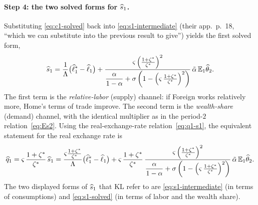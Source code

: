 \paragraph{Step 4: the two solved forms for $\widehat{s}_1$.} Substituting
\eqref{eq:c1-solved} back into \eqref{eq:s1-intermediate} (their app.~p.~18,
``which we can substitute into the previous result to give'') yields the first
solved form,
\begin{equation}
\widehat{s}_1 = \frac{1}{\Lambda}\bigl(\widehat{\ell}^{*}_1-\widehat{\ell}_1\bigr)
+\frac{\varsigma\left(\frac{1+\zeta^{*}}{\zeta^{*}}\right)^2}
{\dfrac{\alpha}{1-\alpha}+\sigma\left(1-\left(\varsigma\,\frac{1+\zeta^{*}}{\zeta^{*}}\right)^2\right)}\,\tilde{\alpha}\,\mathbb{E}_1\widehat{\theta}_2. \label{eq:s1-solved}
\end{equation}
The first term is the \emph{relative-labor} (supply) channel: if Foreign works
relatively more, Home's terms of trade improve. The second term is the
\emph{wealth-share} (demand) channel, with the identical multiplier as in the
period-$2$ relation~\eqref{eq:Es2}. Using the real-exchange-rate
relation~\eqref{eq:q1-s1}, the equivalent statement for the real exchange rate is
\begin{equation}
\widehat{q}_1 = \varsigma\,\frac{1+\zeta^{*}}{\zeta^{*}}\,\widehat{s}_1
=\frac{\varsigma\frac{1+\zeta^{*}}{\zeta^{*}}}{\Lambda}\bigl(\widehat{\ell}^{*}_1-\widehat{\ell}_1\bigr)
+\varsigma\,\frac{1+\zeta^{*}}{\zeta^{*}}\,\frac{\varsigma\left(\frac{1+\zeta^{*}}{\zeta^{*}}\right)^2}
{\dfrac{\alpha}{1-\alpha}+\sigma\left(1-\left(\varsigma\,\frac{1+\zeta^{*}}{\zeta^{*}}\right)^2\right)}\,\tilde{\alpha}\,\mathbb{E}_1\widehat{\theta}_2. \label{eq:q1-solved}
\end{equation}
The two displayed forms of $\widehat{s}_1$ that KL refer to are
\eqref{eq:s1-intermediate} (in terms of consumptions) and \eqref{eq:s1-solved}
(in terms of labor and the wealth share).

